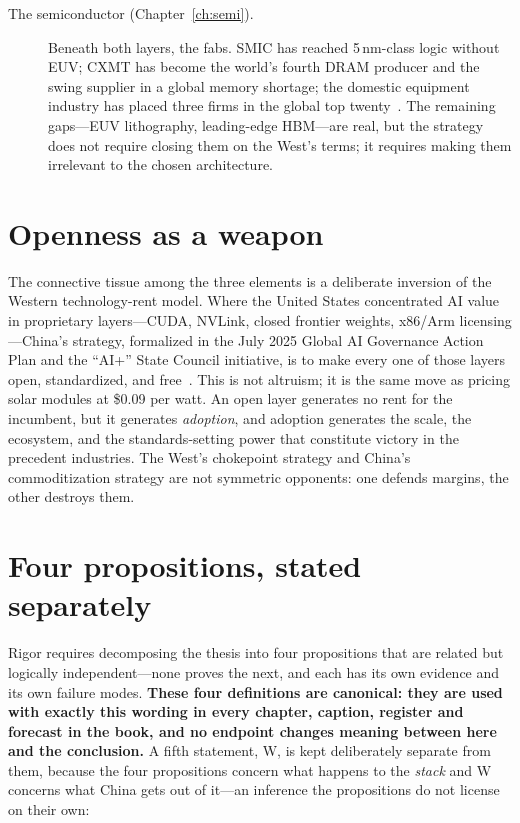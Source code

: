 \begin{description}
  \item[The semiconductor (Chapter~\ref{ch:semi}).] Beneath both layers, the fabs. SMIC has reached 5\,nm-class logic without EUV; CXMT has become the world's fourth DRAM producer and the swing supplier in a global memory shortage; the domestic equipment industry has placed three firms in the global top twenty~\cite{smic-5nm,cxmt-ipo,toolmakers-top20}. The remaining gaps---EUV lithography, leading-edge HBM---are real, but the strategy does not require closing them on the West's terms; it requires making them irrelevant to the chosen architecture.
\end{description}

\section{Openness as a weapon}

The connective tissue among the three elements is a deliberate inversion of the Western technology-rent model. Where the United States concentrated AI value in proprietary layers---CUDA, NVLink, closed frontier weights, x86/Arm licensing---China's strategy, formalized in the July 2025 Global AI Governance Action Plan and the ``AI+'' State Council initiative, is to make every one of those layers open, standardized, and free~\cite{action-plan,ai-plus}. This is not altruism; it is the same move as pricing solar modules at \$0.09 per watt. An open layer generates no rent for the incumbent, but it generates \emph{adoption}, and adoption generates the scale, the ecosystem, and the standards-setting power that constitute victory in the precedent industries. The West's chokepoint strategy and China's commoditization strategy are not symmetric opponents: one defends margins, the other destroys them.

\section{Four propositions, stated separately}
\label{sec:propositions}

Rigor requires decomposing the thesis into four propositions that are related but logically independent---none proves the next, and each has its own evidence and its own failure modes. \textbf{These four definitions are canonical: they are used with exactly this wording in every chapter, caption, register and forecast in the book, and no endpoint changes meaning between here and the conclusion.} A fifth statement, W, is kept deliberately separate from them, because the four propositions concern what happens to the \emph{stack} and W concerns what China gets out of it---an inference the propositions do not license on their own:

